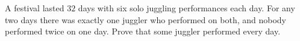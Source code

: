 A festival lasted $32$ days with six solo juggling performances each day. For any two days there was exactly one juggler who performed on both, and nobody performed twice on one day. Prove that some juggler performed every day.
